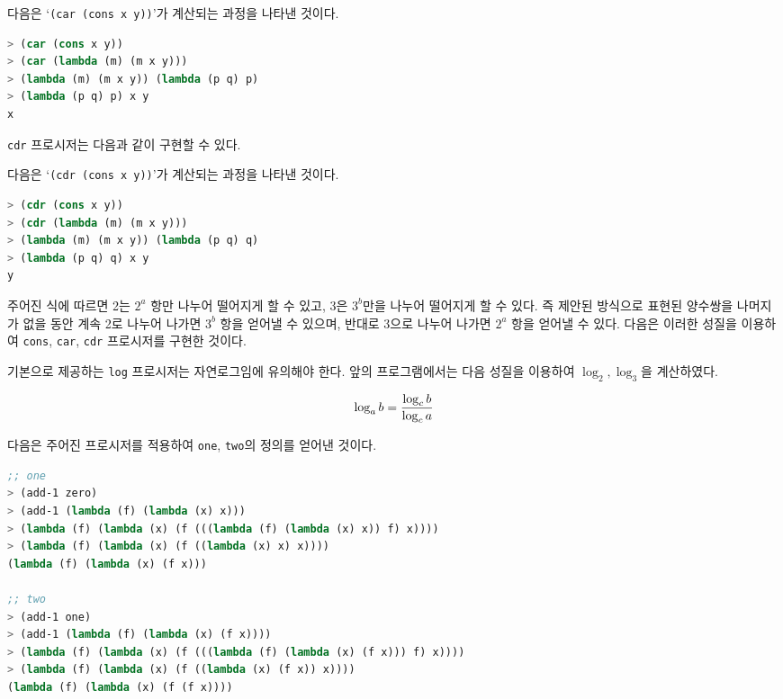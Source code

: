 

다음은 `\texttt{(car (cons x y))}'가 계산되는 과정을 나타낸 것이다.

\begin{lstlisting}[language=Scheme]
> (car (cons x y))
> (car (lambda (m) (m x y)))
> (lambda (m) (m x y)) (lambda (p q) p)
> (lambda (p q) p) x y
x
\end{lstlisting}

\texttt{cdr} 프로시저는 다음과 같이 구현할 수 있다.

다음은 `\texttt{(cdr (cons x y))}'가 계산되는 과정을 나타낸 것이다.

\begin{lstlisting}[language=Scheme]
> (cdr (cons x y))
> (cdr (lambda (m) (m x y)))
> (lambda (m) (m x y)) (lambda (p q) q)
> (lambda (p q) q) x y
y
\end{lstlisting}


주어진 식에 따르면 2는 $2^a$
항만 나누어 떨어지게 할 수 있고, 3은 $3^b$만을 나누어 떨어지게 할 수 있다. 즉
제안된 방식으로 표현된 양수쌍을 나머지가 없을 동안 계속
2로 나누어 나가면 $3^b$ 항을 얻어낼 수 있으며, 반대로 3으로 나누어 나가면
$2^a$ 항을 얻어낼 수 있다. 다음은 이러한 성질을 이용하여
\texttt{cons}, \texttt{car}, \texttt{cdr} 프로시저를 구현한 것이다.


 기본으로 제공하는 \texttt{log} 프로시저는 자연로그임에 유의해야
한다. 앞의 프로그램에서는 다음 성질을 이용하여 $\log_2,\log_3$을 계산하였다.

\begin{equation}\notag
  \log_a b = \frac{\log_c b}{\log_c a}
\end{equation}


다음은 주어진 프로시저를 적용하여 \texttt{one}, \texttt{two}의 정의를 얻어낸
것이다.

\begin{lstlisting}[language=Scheme]
;; one
> (add-1 zero)
> (add-1 (lambda (f) (lambda (x) x)))
> (lambda (f) (lambda (x) (f (((lambda (f) (lambda (x) x)) f) x))))
> (lambda (f) (lambda (x) (f ((lambda (x) x) x))))
(lambda (f) (lambda (x) (f x)))

;; two
> (add-1 one)
> (add-1 (lambda (f) (lambda (x) (f x))))
> (lambda (f) (lambda (x) (f (((lambda (f) (lambda (x) (f x))) f) x))))
> (lambda (f) (lambda (x) (f ((lambda (x) (f x)) x))))
(lambda (f) (lambda (x) (f (f x))))
\end{lstlisting}

